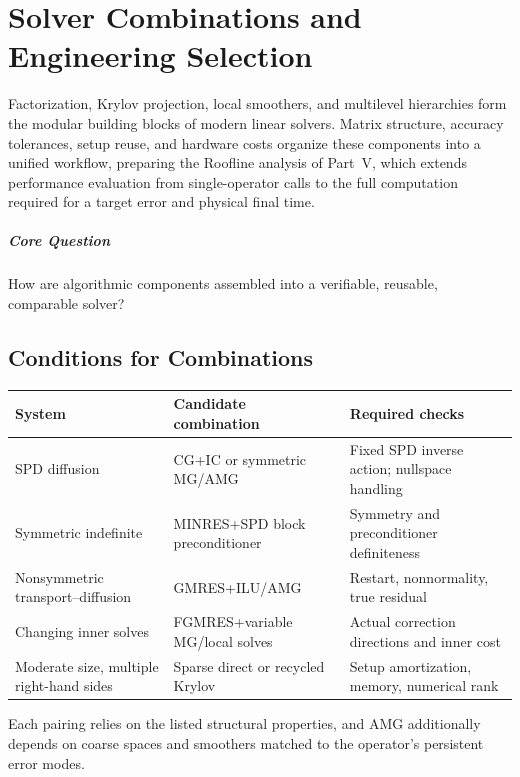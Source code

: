 \chapter{Solver Combinations and Engineering Selection}\label{v0ch:21}
\begin{chaptersummary}
Factorization, Krylov projection, local smoothers, and multilevel hierarchies form the modular building blocks of modern linear solvers. Matrix structure, accuracy tolerances, setup reuse, and hardware costs organize these components into a unified workflow, preparing the Roofline analysis of Part~V, which extends performance evaluation from single-operator calls to the full computation required for a target error and physical final time.
\end{chaptersummary}
\paragraph{Core Question}How are algorithmic components assembled into a verifiable, reusable, comparable solver?

\section{Conditions for Combinations}
\begin{center}\small
\begin{tabularx}{\textwidth}{lXX}
\toprule System&Candidate combination&Required checks\\\midrule
SPD diffusion&CG+IC or symmetric MG/AMG&Fixed SPD inverse action; nullspace handling\\
Symmetric indefinite&MINRES+SPD block preconditioner&Symmetry and preconditioner definiteness\\
Nonsymmetric transport--diffusion&GMRES+ILU/AMG&Restart, nonnormality, true residual\\
Changing inner solves&FGMRES+variable MG/local solves&Actual correction directions and inner cost\\
Moderate size, multiple right-hand sides&Sparse direct or recycled Krylov&Setup amortization, memory, numerical rank\\\bottomrule
\end{tabularx}
\end{center}
Each pairing relies on the listed structural properties, and AMG additionally depends on coarse spaces and smoothers matched to the operator's persistent error modes.
